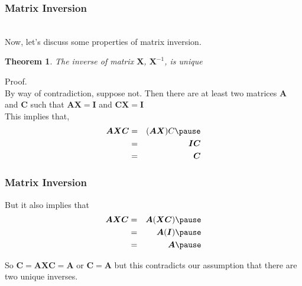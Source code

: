 \documentclass{beamer}
\newtheorem{thm}{Theorem}
\numberwithin{equation}{section}
\begin{document}
\begin{frame}
\frametitle{Matrix Inversion}

\ \\Now, let's discuss some properties of matrix inversion. \pause 

\begin{thm} 
The inverse of matrix $\boldsymbol{X}$, $\boldsymbol{X}^{-1}$, is unique
\end{thm}
\pause 

Proof. \\
By way of contradiction, suppose not. \pause Then there are at least two matrices $\boldsymbol{A}$ and $\boldsymbol{C}$ such that $\boldsymbol{AX} = \boldsymbol{I}$ and $\boldsymbol{CX} = \boldsymbol{I}$ \pause \\
This implies that, \pause
\begin{eqnarray}
\boldsymbol{AXC} & = & (\boldsymbol{A} \boldsymbol{X}) C \nonumber \pause \\
							& = & \boldsymbol{I}\boldsymbol{C} \nonumber \\
							& = & \boldsymbol{C}  \nonumber 
\end{eqnarray}							


\end{frame}

\begin{frame}
\frametitle{Matrix Inversion}

But it also implies that \pause
\begin{eqnarray}
\boldsymbol{AXC}  &  = & \boldsymbol{A}(\boldsymbol{X} \boldsymbol{C} ) \nonumber \pause \\
							&  = & \boldsymbol{A} (\boldsymbol{I} ) \nonumber \pause \\
							& = & \boldsymbol{A} \nonumber \pause
\end{eqnarray}							

So $\boldsymbol{C} = \boldsymbol{AXC}  = \boldsymbol{A}$ or $\boldsymbol{C} =\boldsymbol{A}$ \pause but this contradicts our assumption that there are two unique inverses.   

\end{frame}
\end{document}
